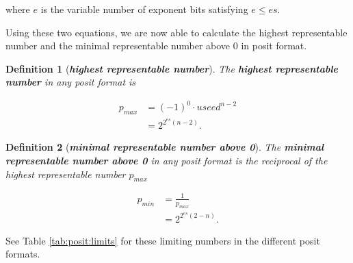\documentclass{article}
\theoremstyle{plain} %
\newtheorem{definition}{Definition}[section]
\theoremstyle{convention} %
\theoremstyle{remark} %
\def\df#1{\textbf{\textit{#1}}}
\numberwithin{equation}{section}
\begin{document}
where $e$ is the variable number of exponent bits satisfying $e \le es$.

Using these two equations, we are now able to calculate the highest representable number and the minimal representable number above \num{0} in posit format.

\begin{definition}[\df{highest representable number}]

The \df{highest representable number} in any posit format is

\begin{align*}
    p_{max} &= (-1)^0 \cdot useed^{n-2} \\
            &= 2^{2^{es}(n-2)}.
\end{align*}

\end{definition}

\begin{definition}[\df{minimal representable number above \num{0}}]

The \df{minimal representable number above \num{0}} in any posit format is the reciprocal of the highest representable number $p_{max}$

\begin{align*}
    p_{min} &= \frac{1}{p_{max}} \\
            &= 2^{2^{es}(2-n)}.
\end{align*}

\end{definition}

See Table \ref{tab:posit:limits} for these limiting numbers in the different posit formats.
\end{document}
